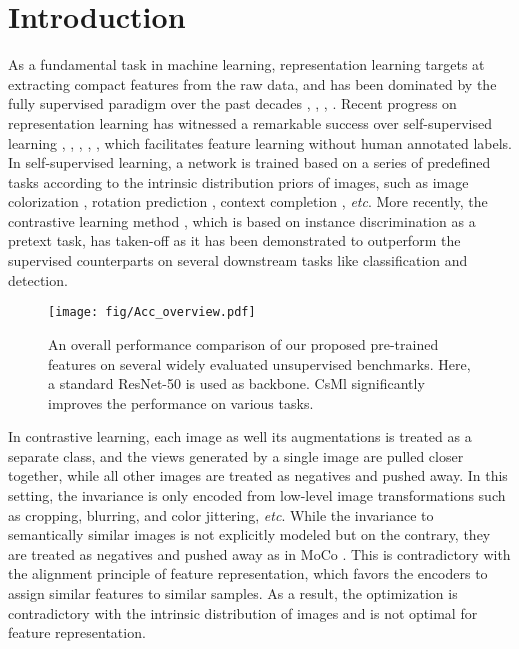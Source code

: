 \documentclass[10pt,twocolumn,letterpaper]{article}
\begin{document}
\section{Introduction}
As a fundamental task in machine learning, representation learning targets at extracting compact features from the raw data, and has been dominated by the fully supervised paradigm over the past decades \cite{he2016deep}, \cite{russakovsky2015imagenet}, \cite{yun2019cutmix}, \cite{zhang2017mixup}. Recent progress on representation learning has witnessed a remarkable success over self-supervised learning \cite{doersch2015unsupervised}, \cite{gidaris2018unsupervised}, \cite{noroozi2016unsupervised}, \cite{pathak2016context}, \cite{wu2018unsupervised}, which facilitates feature learning without human annotated labels. In self-supervised learning, a network is trained based on a series of predefined tasks according to the intrinsic distribution priors of images, such as image colorization \cite{zhang2016colorful}, rotation prediction \cite{gidaris2018unsupervised}, context completion \cite{pathak2016context}, \emph{etc}. More recently, the contrastive learning method \cite{he2020momentum}, which is based on instance discrimination as a pretext task, has taken-off as it has been demonstrated to outperform the supervised counterparts on several downstream tasks like classification and detection.

\begin{figure}[t!]
  \begin{center}
        \texttt{[image: fig/Acc\_overview.pdf]}
  \end{center}
  \vspace{-0.2cm}
     \caption{An overall performance comparison of our proposed pre-trained features on several widely evaluated unsupervised benchmarks. Here, a standard ResNet-50 is used as backbone. CsMl significantly improves the performance on various tasks.}
  \label{overall_results}
\end{figure}



In contrastive learning, each image as well its augmentations is treated as a separate class, and the views generated by a single image are pulled closer together, while all other images are treated as negatives and pushed away. In this setting, the invariance is only encoded from low-level image transformations such as cropping, blurring, and color jittering, \emph{etc}. While the invariance to semantically similar images is not explicitly modeled but on the contrary, they are treated as negatives and pushed away as in MoCo \cite{he2020momentum}. This is contradictory with the alignment principle \cite{wang2020understanding} of feature representation, which favors the encoders to assign similar features to similar samples. As a result, the optimization is contradictory with the intrinsic distribution of images and is not optimal for feature representation. 
\end{document}
